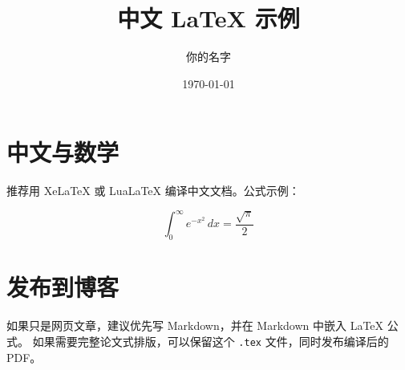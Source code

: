 \documentclass[UTF8]{ctexart}
\title{中文 LaTeX 示例}
\author{你的名字}
\date{\today}
\begin{document}
\maketitle

\section{中文与数学}

推荐用 XeLaTeX 或 LuaLaTeX 编译中文文档。公式示例：

\[
  \int_0^\infty e^{-x^2}\,dx = \frac{\sqrt{\pi}}{2}
\]

\section{发布到博客}

如果只是网页文章，建议优先写 Markdown，并在 Markdown 中嵌入 LaTeX 公式。
如果需要完整论文式排版，可以保留这个 \texttt{.tex} 文件，同时发布编译后的 PDF。
\end{document}

